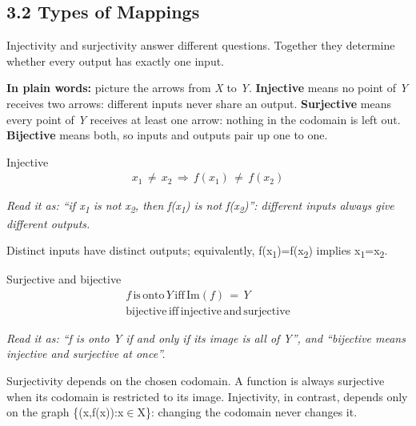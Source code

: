 \documentclass[11pt]{article}
\begin{document}
\begin{keepsection}
\section{3.2 Types of Mappings}

Injectivity and surjectivity answer different questions. Together they determine whether every output has exactly one input.

\begin{plainbox}\textbf{In plain words:} picture the arrows from \textit{X} to \textit{Y}. \textbf{Injective} means no point of \textit{Y} receives two arrows: different inputs never share an output. \textbf{Surjective} means every point of \textit{Y} receives at least one arrow: nothing in the codomain is left out. \textbf{Bijective} means both, so inputs and outputs pair up one to one.\end{plainbox}

\begin{equationcard}{Injective}
\[ \begin{gathered} {x}_{1}\, ≠\, {x}_{2}\, \Rightarrow \, {f}({x}_{1})\, ≠\, {f}({x}_{2}) \end{gathered} \]
{\small \emph{Read it as: “if x\textsubscript{1} is not x\textsubscript{2}, then f(x\textsubscript{1}) is not f(x\textsubscript{2})”: different inputs always give different outputs.}\par Distinct inputs have distinct outputs; equivalently, f(x\textsubscript{1})=f(x\textsubscript{2}) implies x\textsubscript{1}=x\textsubscript{2}.}
\end{equationcard}

\begin{equationcard}{Surjective and bijective}
\[ \begin{gathered} {f}\, \text{is}\, \text{onto}\, {Y}\, \text{iff}\, \text{Im}({f})\, =\, {Y} \\ \text{bijective}\, \text{iff}\, \text{injective}\, \text{and}\, \text{surjective} \end{gathered} \]
{\small \emph{Read it as: “f is onto Y if and only if its image is all of Y”, and “bijective means injective and surjective at once”.}\par Surjectivity depends on the chosen codomain. A function is always surjective when its codomain is restricted to its image. Injectivity, in contrast, depends only on the graph \{(x,f(x)):x\ensuremath{\in}X\}: changing the codomain never changes it.}
\end{equationcard}


\end{keepsection}
\end{document}
